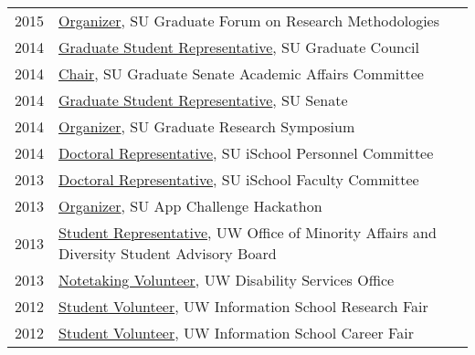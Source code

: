 \documentclass[11pt]{article}
\begin{document}
{{\begin{longtable}{Rp{0.75in}p{5.0in}}
\footnotesize{2015} & \href{http://gradresearch.syr.edu}{{Organizer}}, SU Graduate Forum on Research Methodologies\\

\footnotesize{2014} & \href{http://gradorg.syr.edu/senate/committees/}{{Graduate Student Representative}}, SU Graduate Council\\

\footnotesize{2014} & \href{http://gradorg.syr.edu/senate/committees/}{{Chair}}, SU Graduate Senate Academic Affairs Committee\\

\footnotesize{2014} & \href{http://universitysenate.syr.edu/}{{Graduate Student Representative}}, SU Senate\\

\footnotesize{2014} & \href{https://www.facebook.com/pg/sugrads/photos/?tab=album&album_id=874022975972914}{{Organizer}}, SU Graduate Research Symposium\\

\footnotesize{2014} & \href{https://ischool.syr.edu/}{{Doctoral Representative}}, SU iSchool Personnel Committee\\

\footnotesize{2013} & \href{https://ischool.syr.edu/}{{Doctoral Representative}}, SU iSchool Faculty Committee\\

\footnotesize{2013} & \href{http://dailyorange.com/2013/12/su-app-challenge-to-announce-winners-thursday/}{{Organizer}}, SU App Challenge Hackathon\\

\footnotesize{2013} & \href{https://www.washington.edu/omad/2014/05/09/no-longer-invisible-bryan-dosono/}{{Student Representative}}, UW Office of Minority Affairs and Diversity Student Advisory Board\\

\footnotesize{2013} & \href{https://depts.washington.edu/uwdrs/current-students/accommodations/notetaking/}{{Notetaking Volunteer}}, UW Disability Services Office\\

\footnotesize{2012} & \href{https://ischool.uw.edu/current/career-services}{{Student Volunteer}}, UW Information School Research Fair\\

\footnotesize{2012} & \href{https://web.archive.org/web/20130104065107/https://ischool.uw.edu/news/2012/11/annual-ischool-research-fair-showcases-faculty-and-student-work}{{Student Volunteer}}, UW Information School Career Fair\\


\end{longtable}}}
\end{document}
